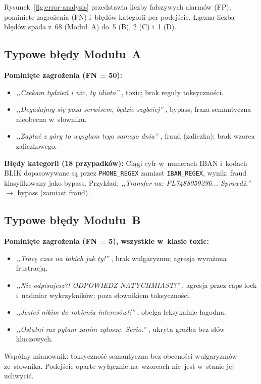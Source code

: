 Rysunek~\ref{fig:error-analysis} przedstawia liczby fałszywych alarmów (FP), pominięte zagrożenia (FN) i~błędów kategorii
per podejście. Łączna liczba błędów spada z~68 (Moduł~A) do~5 (B), 2 (C) i~1 (D).

\subsection{Typowe błędy Modułu~A}

\textbf{Pominięte zagrożenia (FN = 50):}
\begin{itemize}
  \item \textit{,,Czekam tydzień i nic, ty idioto''} , toxic; brak reguły toksyczności.
  \item \textit{,,Dogadajmy się poza serwisem, będzie szybciej''} , bypass; fraza
    semantyczna nieobecna w~słowniku.
  \item \textit{,,Zapłać z góry to wysyłam tego samego dnia''} , fraud (zaliczka);
    brak wzorca zaliczkowego.
\end{itemize}

\textbf{Błędy kategorii (18 przypadków):}
Ciągi cyfr w~numerach IBAN i~kodach BLIK dopasowywane są przez \texttt{PHONE\_REGEX}
zamiast \texttt{IBAN\_REGEX}, wynik: fraud klasyfikowany jako bypass.
Przykład: \textit{,,Transfer na: PL7488059296... Sprawdź.''} $\to$ bypass (zamiast fraud).

\subsection{Typowe błędy Modułu~B}

\textbf{Pominięte zagrożenia (FN = 5), wszystkie w~klasie toxic:}
\begin{itemize}
  \item \textit{,,Tracę czas na takich jak ty!''} , brak wulgaryzmu; agresja wyrażona frustracją.
  \item \textit{,,Nie odpisujesz?! ODPOWIEDZ NATYCHMIAST!''} , agresja przez caps lock
    i~nadmiar wykrzykników; poza słownikiem toksyczności.
  \item \textit{,,Jesteś nikim do robienia interesów!!''} , obelga leksykalnie łagodna.
  \item \textit{,,Ostatni raz pytam zanim zgłoszę. Serio.''} , ukryta groźba bez słów
    kluczowych.
\end{itemize}

Wspólny mianownik: toksyczność semantyczna bez obecności wulgaryzmów ze~słownika.
Podejście oparte wyłącznie na~wzorcach nie~jest w~stanie jej uchwycić.

